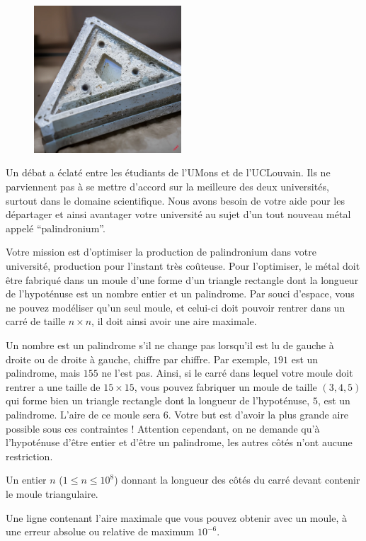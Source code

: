\problemname{\problemyamlname}

\begin{figure}
    \centering
    \includegraphics[width=5.5cm]{palindromium.jpg}
\end{figure}
Un débat a éclaté entre les étudiants de l'UMons et de l'UCLouvain.
Ils ne parviennent pas à se mettre d'accord sur la meilleure des deux universités, surtout dans le domaine scientifique.
Nous avons besoin de votre aide pour les départager et ainsi avantager votre université au sujet d'un tout nouveau métal appelé ``palindronium''.

Votre mission est d'optimiser la production de palindronium dans votre université, production pour l'instant très coûteuse.
Pour l'optimiser, le métal doit être fabriqué dans un moule d'une forme d'un triangle rectangle dont la longueur de l'hypoténuse est un nombre entier et un palindrome.
Par souci d'espace, vous ne pouvez modéliser qu'un seul moule, et celui-ci doit pouvoir rentrer dans un carré de taille $n \times n$, il doit ainsi avoir une aire maximale.

Un nombre est un palindrome s'il ne change pas lorsqu'il est lu de gauche à droite ou de droite à gauche, chiffre par chiffre.
Par exemple, $191$ est un palindrome, mais $155$ ne l'est pas.
Ainsi, si le carré dans lequel votre moule doit rentrer a une taille de $15 \times 15$, vous pouvez fabriquer un moule de taille $(3,4,5)$ qui forme bien un triangle rectangle dont la longueur de l'hypoténuse, $5$, est un palindrome.
L'aire de ce moule sera $6$.
Votre but est d'avoir la plus grande aire possible sous ces contraintes ! Attention cependant, on ne demande qu'à l'hypoténuse d'être entier et d'être un palindrome, les autres côtés n'ont aucune restriction.

\begin{Input}
	Un entier $n$ ($1 \le n \le 10^8$) donnant la longueur des côtés du carré devant contenir le moule triangulaire.
\end{Input}

\begin{Output}
	Une ligne contenant l'aire maximale que vous pouvez obtenir avec un
	moule, à une erreur absolue ou relative de maximum $10^{-6}$.
\end{Output}
